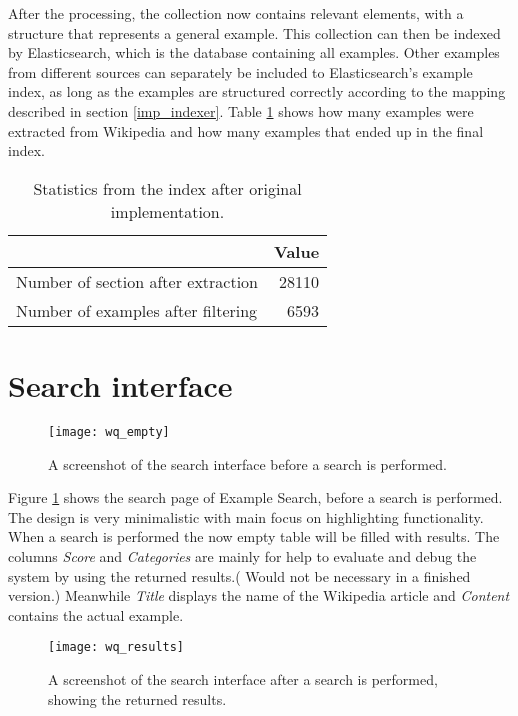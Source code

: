 After the processing, the collection now contains relevant elements, with a structure that represents a general example. This collection can then be indexed by Elasticsearch, which is the database containing all examples. Other examples from different sources can separately be included to Elasticsearch's example index, as long as the examples are structured correctly according to the mapping described in section \ref{imp_indexer}. Table \ref{table:indexStats} shows how many examples were extracted from Wikipedia and how many examples that ended up in the final index.


\begin{table}[H]
\centering
\begin{tabular} {|| p{15em} | r ||} 
 \hline
  & Value \\ [0.5ex] 
 \hline
Number of section after extraction & 28110 \\
Number of examples after filtering & 6593 \\
 \hline
\end{tabular}
\caption{Statistics from the index after original implementation.}
\label{table:indexStats}
\end{table}

\section{Search interface} \label{5:interface}

\begin{figure}[H] 
\caption{A screenshot of the search interface before a search is performed.}
\centering
\texttt{[image: wq\_empty]}
\label{fig:wq_empty}
\end{figure}

Figure \ref{fig:wq_empty} shows the search page of Example Search, before a search is performed. The design is very minimalistic with main focus on highlighting functionality. When a search is performed the now empty table will be filled with results. The columns \textit{Score} and \textit{Categories} are mainly for help to evaluate and debug the system by using the returned results.( Would not be necessary in a finished version.) Meanwhile \textit{Title} displays the name of the Wikipedia article and \textit{Content} contains the actual example.


\begin{figure}[H] 
\caption{A screenshot of the search interface after a search is performed, showing the returned results.}
\texttt{[image: wq\_results]}
\label{fig:wq_results}
\end{figure}

